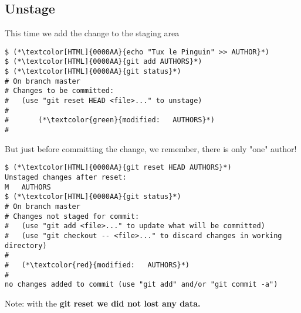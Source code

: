 \subsection{Unstage}
\begin{frame}[fragile]
\subslidetitle

This time we add the change to the staging area

\begin{lstlisting}
$ (*\textcolor[HTML]{0000AA}{echo "Tux le Pinguin" >> AUTHOR}*)
$ (*\textcolor[HTML]{0000AA}{git add AUTHORS}*)
$ (*\textcolor[HTML]{0000AA}{git status}*)
# On branch master
# Changes to be committed:
#   (use "git reset HEAD <file>..." to unstage)
#
#       (*\textcolor{green}{modified:   AUTHORS}*)
#
\end{lstlisting}

But just before committing the change, we remember, there is only "one" author!

\begin{lstlisting}
$ (*\textcolor[HTML]{0000AA}{git reset HEAD AUTHORS}*)
Unstaged changes after reset:
M	AUTHORS
$ (*\textcolor[HTML]{0000AA}{git status}*)
# On branch master
# Changes not staged for commit:
#   (use "git add <file>..." to update what will be committed)
#   (use "git checkout -- <file>..." to discard changes in working directory)
#
#	(*\textcolor{red}{modified:   AUTHORS}*)
#
no changes added to commit (use "git add" and/or "git commit -a")
\end{lstlisting}

Note: with the \bf{git reset} we did not lost any data.

\end{frame}

